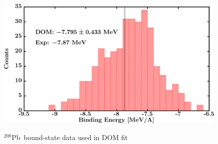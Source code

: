 \documentclass[twocolumn,secnumarabic,amssymb, nobibnotes, aps, prl,
superscriptaddress, nobalancelastpage]{revtex4}
\newcommand{\pbEight}{\ensuremath{^{208}}P\lowercase{b}}
\begin{document}
\begin{figure}[!htb]
\begin{minipage}{0.4\linewidth}
        \label{DOM_pb208_RMSRadius}
    \end{minipage}
    \begin{minipage}{0.4\linewidth}
        \centering
        \includegraphics[width=\linewidth]{figures/pb208_BE.png}
        \label{DOM_pb208_BE}
    \end{minipage}
    \caption{\pbEight\ bound-state data used in DOM fit}
    \label{DOM_pb208_structural}
\end{figure}
\end{document}
